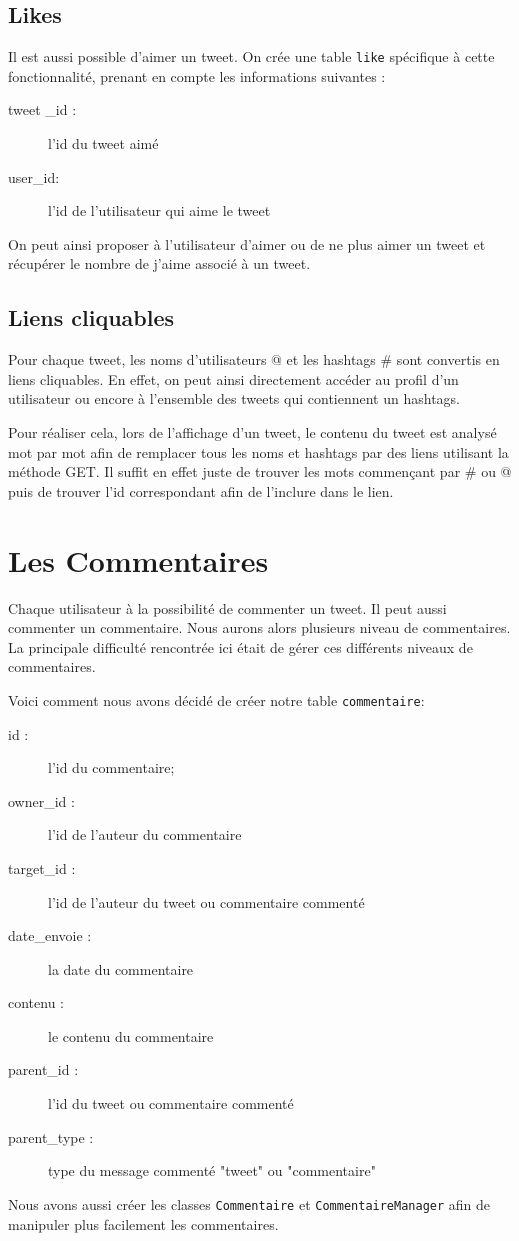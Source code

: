 \documentclass[a4paper, 12pt]{article}
\begin{document}
\subsection{Likes}
Il est aussi possible d'aimer un tweet. On crée une table \texttt{like} spécifique à cette fonctionnalité, prenant en compte les informations suivantes :
\begin{description}
\item[tweet \_id :] l’id du tweet aimé
\item[user\_id:] l'id de l'utilisateur qui aime le tweet
\end{description}
On peut ainsi proposer à l'utilisateur d'aimer ou de ne plus aimer un tweet et récupérer le nombre de j'aime associé à un tweet.

\subsection{Liens cliquables}		
Pour chaque tweet, les noms d'utilisateurs @ et les hashtags \# sont convertis en liens cliquables. En effet, on peut ainsi directement accéder au profil d'un utilisateur ou encore à l'ensemble des tweets qui contiennent un hashtags. 

Pour réaliser cela, lors de l'affichage d'un tweet, le contenu du tweet est analysé mot par mot afin de remplacer tous les noms et hashtags par des liens utilisant la méthode GET. Il suffit en effet juste de trouver les mots commençant par \# ou @ puis de trouver l'id correspondant afin de l'inclure dans le lien.



\section{Les Commentaires}	
Chaque utilisateur à la possibilité de commenter un tweet. Il peut aussi commenter un commentaire. Nous aurons alors plusieurs niveau de commentaires. La principale difficulté rencontrée ici était de gérer ces différents niveaux de commentaires.

Voici comment nous avons décidé de créer notre table \texttt{commentaire}:
\begin{description}
\item[id :] l'id du commentaire;
\item[owner\_id :] l'id de l'auteur du commentaire
\item[target\_id :] l'id de l'auteur du tweet ou commentaire commenté
\item[date\_envoie :] la date du commentaire
\item[contenu :] le contenu du commentaire
\item[parent\_id :] l'id du tweet ou commentaire commenté
\item[parent\_type :] type du message commenté "tweet" ou "commentaire"
\end{description}
Nous avons aussi créer les classes \texttt{Commentaire} et \texttt{CommentaireManager} afin de manipuler plus facilement les commentaires.
\end{document}
